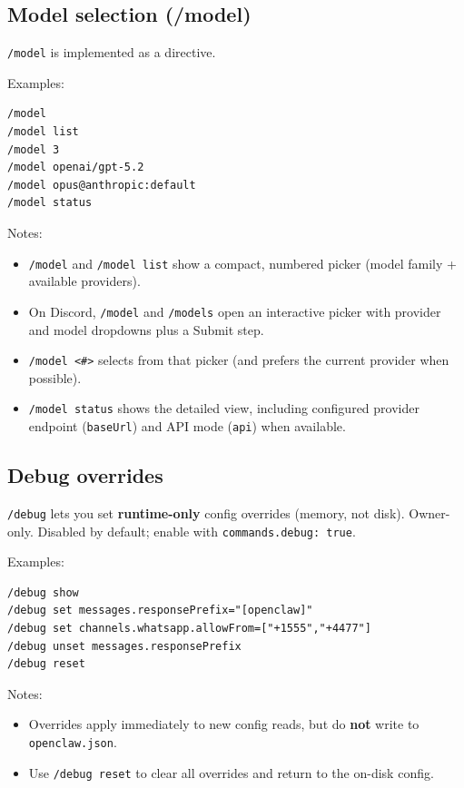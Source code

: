 \subsection{Model selection (/model)}


\texttt{/model} is implemented as a directive.

Examples:

\begin{lstlisting}
/model
/model list
/model 3
/model openai/gpt-5.2
/model opus@anthropic:default
/model status
\end{lstlisting}


Notes:

\begin{itemize}
  \item \texttt{/model} and \texttt{/model list} show a compact, numbered picker (model family + available providers).
  \item On Discord, \texttt{/model} and \texttt{/models} open an interactive picker with provider and model dropdowns plus a Submit step.
  \item \texttt{/model <\#>} selects from that picker (and prefers the current provider when possible).
  \item \texttt{/model status} shows the detailed view, including configured provider endpoint (\texttt{baseUrl}) and API mode (\texttt{api}) when available.
\end{itemize}


\subsection{Debug overrides}


\texttt{/debug} lets you set \textbf{runtime-only} config overrides (memory, not disk). Owner-only. Disabled by default; enable with \texttt{commands.debug: true}.

Examples:

\begin{lstlisting}
/debug show
/debug set messages.responsePrefix="[openclaw]"
/debug set channels.whatsapp.allowFrom=["+1555","+4477"]
/debug unset messages.responsePrefix
/debug reset
\end{lstlisting}


Notes:

\begin{itemize}
  \item Overrides apply immediately to new config reads, but do \textbf{not} write to \texttt{openclaw.json}.
  \item Use \texttt{/debug reset} to clear all overrides and return to the on-disk config.
\end{itemize}


